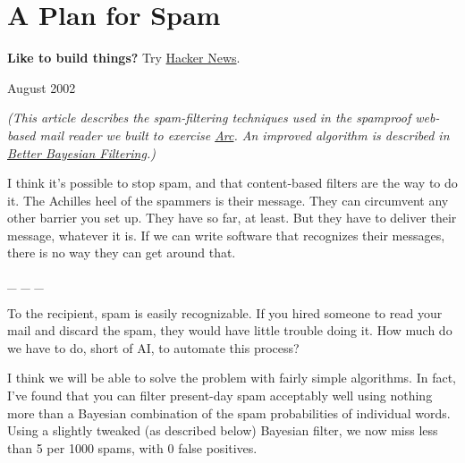 \chapter{A Plan for Spam}


            
              
                


                    
                      
                        
                          \textbf{Like to build things?} Try
                          \href{http://news.ycombinator.com}{Hacker News}.
                        
                        

                      
                    
                  
                  
                    August 2002

\emph{(This article describes the spam-filtering techniques
                      used in the spamproof web-based mail reader we built to
                      exercise \href{http://www.paulgraham.com/arc.html}{Arc}. An improved algorithm
                      is described in
                      \href{http://www.paulgraham.com/better.html}{Better Bayesian Filtering}.)}

I think it's possible to stop spam, and that
                    content-based filters are the way to do it. The Achilles
                    heel of the spammers is their message. They can circumvent
                    any other barrier you set up. They have so far, at least.
                    But they have to deliver their message, whatever it is. If
                    we can write software that recognizes their messages, there
                    is no way they can get around that.


                    
\_ \_ \_
                    

To the recipient, spam is easily recognizable.
                    If you hired someone to read your mail and discard the spam,
                    they would have little trouble doing it. How much do we have
                    to do, short of AI, to automate this process?

I
                    think we will be able to solve the problem with fairly
                    simple algorithms. In fact, I've found that you can filter
                    present-day spam acceptably well using nothing more than a
                    Bayesian combination of the spam probabilities of individual
                    words. Using a slightly tweaked (as described below)
                    Bayesian filter, we now miss less than 5 per 1000 spams,
                    with 0 false positives.

